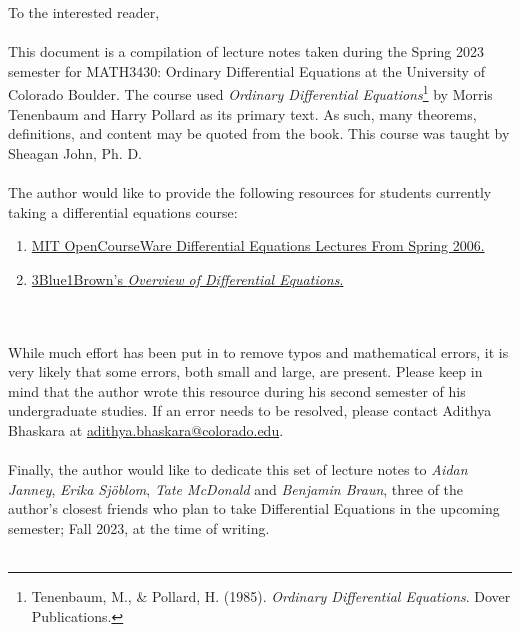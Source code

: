To the interested reader,
\\
\\
This document is a compilation of lecture notes taken during the Spring 2023 semester for MATH3430: Ordinary Differential Equations at the University of Colorado Boulder. The course used \textit{Ordinary Differential Equations}\footnote{Tenenbaum, M., \& Pollard, H. (1985). \textit{Ordinary Differential Equations}. Dover Publications. } by Morris Tenenbaum and Harry Pollard as its primary text. As such, many theorems, definitions, and content may be quoted from the book. This course was taught by Sheagan John, Ph. D.
\\
\\
The author would like to provide the following resources for students currently taking a differential equations course:
\begin{enumerate}
    \item \href{https://www.youtube.com/playlist?list=PLEC88901EBADDD980}{MIT OpenCourseWare Differential Equations Lectures From Spring 2006.}
    \item \href{https://www.youtube.com/playlist?list=PLZHQObOWTQDNPOjrT6KVlfJuKtYTftqH6}{3Blue1Brown's \textit{Overview of Differential Equations}.}
\end{enumerate}
\vphantom
\\
\\
While much effort has been put in to remove typos and mathematical errors, it is very likely that some errors, both small and large, are present. Please keep in mind that the author wrote this resource during his second semester of his undergraduate studies. If an error needs to be resolved, please contact Adithya Bhaskara at \href{mailto:adithya.bhaskara@colorado.edu}{adithya.bhaskara@colorado.edu}.
\\
\\
Finally, the author would like to dedicate this set of lecture notes to \textit{Aidan Janney}, \textit{Erika Sj\"{o}blom}, \textit{Tate McDonald} and \textit{Benjamin Braun}, three of the author's closest friends who plan to take Differential Equations in the upcoming semester; Fall 2023, at the time of writing.
\\
\\
\vfill
{}